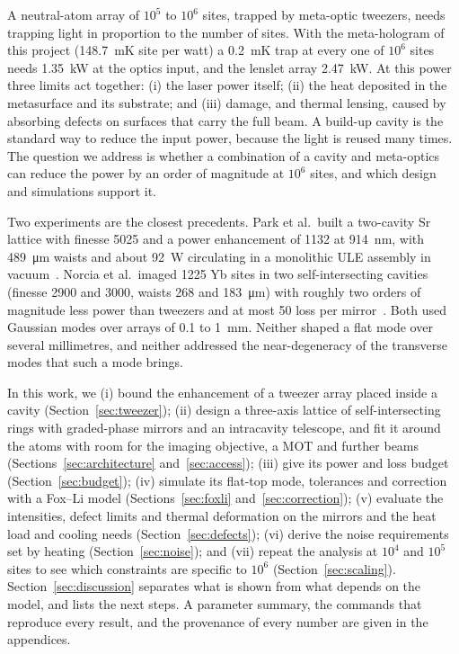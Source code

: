 \documentclass[11pt]{article}
\begin{document}
A neutral-atom array of $10^{5}$ to $10^{6}$ sites, trapped by meta-optic tweezers, needs trapping
light in proportion to the number of sites. With the meta-hologram of this project (\SI{148.7}{\milli\kelvin}
site per watt) a \SI{0.2}{\milli\kelvin} trap at every one of $10^{6}$ sites needs \SI{1.35}{\kilo\watt}
at the optics input, and the lenslet array \SI{2.47}{\kilo\watt}. At this power three limits act
together: (i) the laser power itself; (ii) the heat deposited in the metasurface and its substrate;
and (iii) damage, and thermal lensing, caused by absorbing defects on surfaces that carry the full
beam. A build-up cavity is the standard way to reduce the input power, because the light is reused
many times. The question we address is whether a combination of a cavity and meta-optics can reduce
the power by an order of magnitude at $10^{6}$ sites, and which design and simulations support it.

Two experiments are the closest precedents. Park et al.\ built a two-cavity Sr lattice with finesse
5025 and a power enhancement of 1132 at \SI{914}{\nano\metre}, with \SI{489}{\micro\metre} waists and
about \SI{92}{\watt} circulating in a monolithic ULE assembly in vacuum~\cite{Park2022}. Norcia et al.\
imaged 1225 Yb sites in two self-intersecting cavities (finesse 2900 and 3000, waists 268 and
\SI{183}{\micro\metre}) with roughly two orders of magnitude less power than tweezers and at most
\SI{50}{\ppm} loss per mirror~\cite{Norcia2024}. Both used Gaussian modes over arrays of 0.1 to
\SI{1}{\milli\metre}. Neither shaped a flat mode over several millimetres, and neither addressed the
near-degeneracy of the transverse modes that such a mode brings.

In this work, we (i) bound the enhancement of a tweezer array placed inside a cavity
(Section~\ref{sec:tweezer}); (ii) design a three-axis lattice of self-intersecting rings with
graded-phase mirrors and an intracavity telescope, and fit it around the atoms with room for the
imaging objective, a MOT and further beams (Sections~\ref{sec:architecture} and~\ref{sec:access});
(iii) give its power and loss budget (Section~\ref{sec:budget}); (iv) simulate its flat-top mode,
tolerances and correction with a Fox--Li model (Sections~\ref{sec:foxli} and~\ref{sec:correction});
(v) evaluate the intensities, defect limits and thermal deformation on the mirrors
and the heat load and cooling needs (Section~\ref{sec:defects}); (vi) derive the noise requirements set by heating
(Section~\ref{sec:noise}); and (vii) repeat the analysis at $10^{4}$ and $10^{5}$ sites to see which
constraints are specific to $10^{6}$ (Section~\ref{sec:scaling}). Section~\ref{sec:discussion} separates what is shown from what depends
on the model, and lists the next steps. A parameter summary, the commands that reproduce every
result, and the provenance of every number are given in the appendices.
\end{document}
